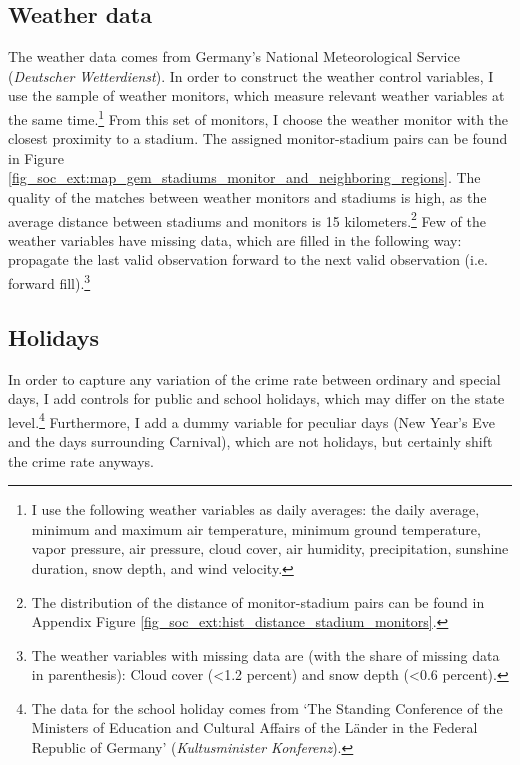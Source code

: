 \subsection{Weather data}
The weather data comes from Germany's National Meteorological Service (\textit{Deutscher Wetterdienst}). In order to construct the weather control variables, I use the sample of weather monitors, which measure relevant weather variables at the same time.\footnote{I use the following weather variables as daily averages: the daily average, minimum and maximum air temperature, minimum ground temperature, vapor pressure, air pressure, cloud cover, air humidity, precipitation, sunshine duration, snow depth, and wind velocity.} From this set of monitors, I choose the weather monitor with the closest proximity to a stadium. The assigned monitor-stadium pairs can be found in Figure \ref{fig_soc_ext:map_gem_stadiums_monitor_and_neighboring_regions}. The quality of the matches between weather monitors and stadiums is high, as the average distance between stadiums and monitors is 15 kilometers.\footnote{The distribution of the distance of monitor-stadium pairs can be found in Appendix Figure \ref{fig_soc_ext:hist_distance_stadium_monitors}.} Few of the weather variables have missing data, which are filled in the following way: propagate the last valid observation forward to the next valid observation (i.e. forward fill).\footnote{The weather variables with missing data are (with the share of missing data in parenthesis): Cloud cover (<1.2 percent) and snow depth (<0.6 percent).}



\subsection{Holidays}
In order to capture any variation of the crime rate between ordinary and special days, I add controls for public and school holidays, which may differ on the state level.\footnote{The data for the school holiday comes from `The Standing Conference of the Ministers of Education and Cultural Affairs of the Länder in the Federal Republic of Germany' (\textit{Kultusminister Konferenz}).} Furthermore, I add a dummy variable for peculiar days (New Year's Eve and the days surrounding Carnival), which are not holidays, but certainly shift the crime rate anyways.



